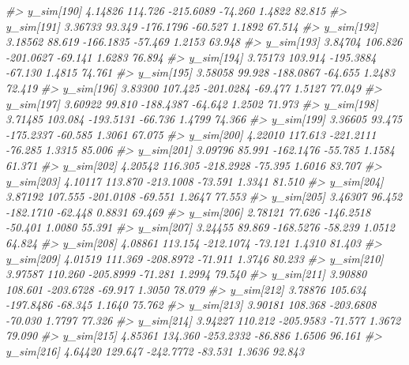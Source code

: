 \documentclass[
  10pt,
  italian,
  a4paper,
  extrafontsizes,onecolumn,openright
  ]{memoir}
\newenvironment{Shaded}{\begin{snugshade}}{\end{snugshade}}
\newcommand{\CommentTok}[1]{\textcolor[rgb]{0.56,0.35,0.01}{\textit{#1}}}
\begin{document}
\begin{Shaded}
\begin{Highlighting}[]
\CommentTok{\#\textgreater{}   y\_sim[190]  4.14826 114.726 {-}215.6089 {-}74.260  1.4822  82.815}
\CommentTok{\#\textgreater{}   y\_sim[191]  3.36733  93.349 {-}176.1796 {-}60.527  1.1892  67.514}
\CommentTok{\#\textgreater{}   y\_sim[192]  3.18562  88.619 {-}166.1835 {-}57.469  1.2153  63.948}
\CommentTok{\#\textgreater{}   y\_sim[193]  3.84704 106.826 {-}201.0627 {-}69.141  1.6283  76.894}
\CommentTok{\#\textgreater{}   y\_sim[194]  3.75173 103.914 {-}195.3884 {-}67.130  1.4815  74.761}
\CommentTok{\#\textgreater{}   y\_sim[195]  3.58058  99.928 {-}188.0867 {-}64.655  1.2483  72.419}
\CommentTok{\#\textgreater{}   y\_sim[196]  3.83300 107.425 {-}201.0284 {-}69.477  1.5127  77.049}
\CommentTok{\#\textgreater{}   y\_sim[197]  3.60922  99.810 {-}188.4387 {-}64.642  1.2502  71.973}
\CommentTok{\#\textgreater{}   y\_sim[198]  3.71485 103.084 {-}193.5131 {-}66.736  1.4799  74.366}
\CommentTok{\#\textgreater{}   y\_sim[199]  3.36605  93.475 {-}175.2337 {-}60.585  1.3061  67.075}
\CommentTok{\#\textgreater{}   y\_sim[200]  4.22010 117.613 {-}221.2111 {-}76.285  1.3315  85.006}
\CommentTok{\#\textgreater{}   y\_sim[201]  3.09796  85.991 {-}162.1476 {-}55.785  1.1584  61.371}
\CommentTok{\#\textgreater{}   y\_sim[202]  4.20542 116.305 {-}218.2928 {-}75.395  1.6016  83.707}
\CommentTok{\#\textgreater{}   y\_sim[203]  4.10117 113.870 {-}213.1008 {-}73.591  1.3341  81.510}
\CommentTok{\#\textgreater{}   y\_sim[204]  3.87192 107.555 {-}201.0108 {-}69.551  1.2647  77.553}
\CommentTok{\#\textgreater{}   y\_sim[205]  3.46307  96.452 {-}182.1710 {-}62.448  0.8831  69.469}
\CommentTok{\#\textgreater{}   y\_sim[206]  2.78121  77.626 {-}146.2518 {-}50.401  1.0080  55.391}
\CommentTok{\#\textgreater{}   y\_sim[207]  3.24455  89.869 {-}168.5276 {-}58.239  1.0512  64.824}
\CommentTok{\#\textgreater{}   y\_sim[208]  4.08861 113.154 {-}212.1074 {-}73.121  1.4310  81.403}
\CommentTok{\#\textgreater{}   y\_sim[209]  4.01519 111.369 {-}208.8972 {-}71.911  1.3746  80.233}
\CommentTok{\#\textgreater{}   y\_sim[210]  3.97587 110.260 {-}205.8999 {-}71.281  1.2994  79.540}
\CommentTok{\#\textgreater{}   y\_sim[211]  3.90880 108.601 {-}203.6728 {-}69.917  1.3050  78.079}
\CommentTok{\#\textgreater{}   y\_sim[212]  3.78876 105.634 {-}197.8486 {-}68.345  1.1640  75.762}
\CommentTok{\#\textgreater{}   y\_sim[213]  3.90181 108.368 {-}203.6808 {-}70.030  1.7797  77.326}
\CommentTok{\#\textgreater{}   y\_sim[214]  3.94227 110.212 {-}205.9583 {-}71.577  1.3672  79.090}
\CommentTok{\#\textgreater{}   y\_sim[215]  4.85361 134.360 {-}253.2332 {-}86.886  1.6506  96.161}
\CommentTok{\#\textgreater{}   y\_sim[216]  4.64420 129.647 {-}242.7772 {-}83.531  1.3636  92.843}

\end{Highlighting}
\end{Shaded}
\end{document}
